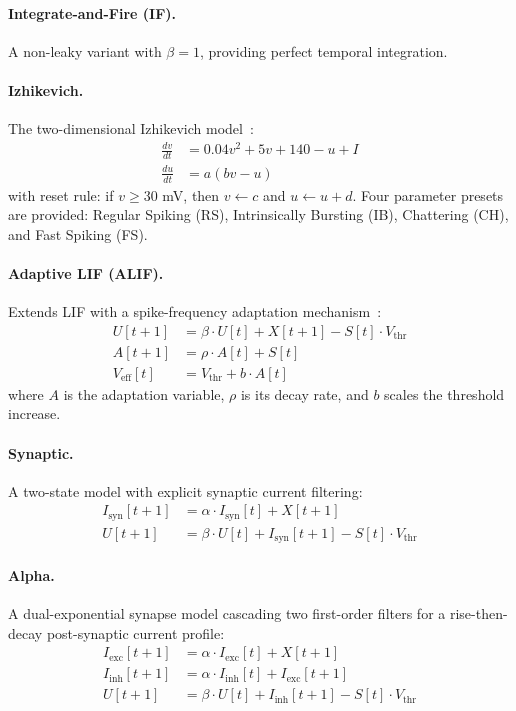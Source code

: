 \documentclass[11pt]{article}
\begin{document}
\paragraph{Integrate-and-Fire (IF).}
A non-leaky variant with $\beta = 1$, providing perfect temporal integration.

\paragraph{Izhikevich.}
The two-dimensional Izhikevich model~\citep{izhikevich2003simple}:
\begin{align}
    \frac{dv}{dt} &= 0.04v^2 + 5v + 140 - u + I \label{eq:izh_v} \\
    \frac{du}{dt} &= a(bv - u) \label{eq:izh_u}
\end{align}
with reset rule: if $v \geq 30$ mV, then $v \leftarrow c$ and $u \leftarrow u + d$. Four parameter presets are provided: Regular Spiking (RS), Intrinsically Bursting (IB), Chattering (CH), and Fast Spiking (FS).

\paragraph{Adaptive LIF (ALIF).}
Extends LIF with a spike-frequency adaptation mechanism~\citep{bellec2018long}:
\begin{align}
    U[t+1] &= \beta \cdot U[t] + X[t+1] - S[t] \cdot V_{\text{thr}} \\
    A[t+1] &= \rho \cdot A[t] + S[t] \\
    V_{\text{eff}}[t] &= V_{\text{thr}} + b \cdot A[t]
\end{align}
where $A$ is the adaptation variable, $\rho$ is its decay rate, and $b$ scales the threshold increase.

\paragraph{Synaptic.}
A two-state model with explicit synaptic current filtering:
\begin{align}
    I_{\text{syn}}[t+1] &= \alpha \cdot I_{\text{syn}}[t] + X[t+1] \\
    U[t+1] &= \beta \cdot U[t] + I_{\text{syn}}[t+1] - S[t] \cdot V_{\text{thr}}
\end{align}

\paragraph{Alpha.}
A dual-exponential synapse model cascading two first-order filters for a rise-then-decay post-synaptic current profile:
\begin{align}
    I_{\text{exc}}[t+1] &= \alpha \cdot I_{\text{exc}}[t] + X[t+1] \\
    I_{\text{inh}}[t+1] &= \alpha \cdot I_{\text{inh}}[t] + I_{\text{exc}}[t+1] \\
    U[t+1] &= \beta \cdot U[t] + I_{\text{inh}}[t+1] - S[t] \cdot V_{\text{thr}}
\end{align}
\end{document}
